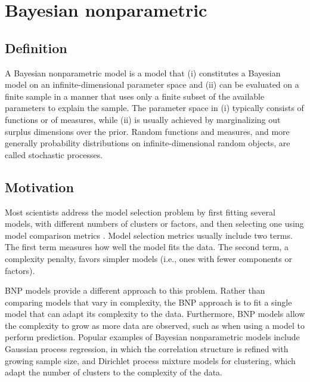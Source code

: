 \chapter{Bayesian nonparametric}

\section{Definition} \label{BNP_def}
A Bayesian nonparametric model is a model that (i) constitutes a Bayesian model on an infinite-dimensional parameter space and (ii) can be evaluated on a finite sample in a manner that uses only a finite subset of the available parameters to explain the sample.
The parameter space in (i) typically consists of functions or of measures, while (ii) is usually achieved by marginalizing out surplus dimensions over the prior. Random functions and measures, and more generally probability distributions on infinite-dimensional random objects, are called stochastic processes.


\section{Motivation}
Most scientists address the model selection problem by first fitting several models, with different numbers of clusters or factors, and then selecting one using model comparison metrics \cite{Claeskens:1251912}. Model selection metrics usually include two terms. The first term measures how well the model fits the data. The second term, a complexity penalty, favors simpler models (i.e., ones with fewer components or factors).

\gls{BNP} models provide a different approach to this problem. Rather than comparing models that vary in complexity, the \gls{BNP} approach is to fit a single model that can adapt its complexity to the data. Furthermore, \gls{BNP} models allow the complexity to grow as more data are observed, such as when using a model to perform prediction.
Popular examples of Bayesian nonparametric models include Gaussian process regression, in which the correlation structure is refined with growing sample size, and Dirichlet process mixture models for clustering, which adapt the number of clusters to the complexity of the data.




